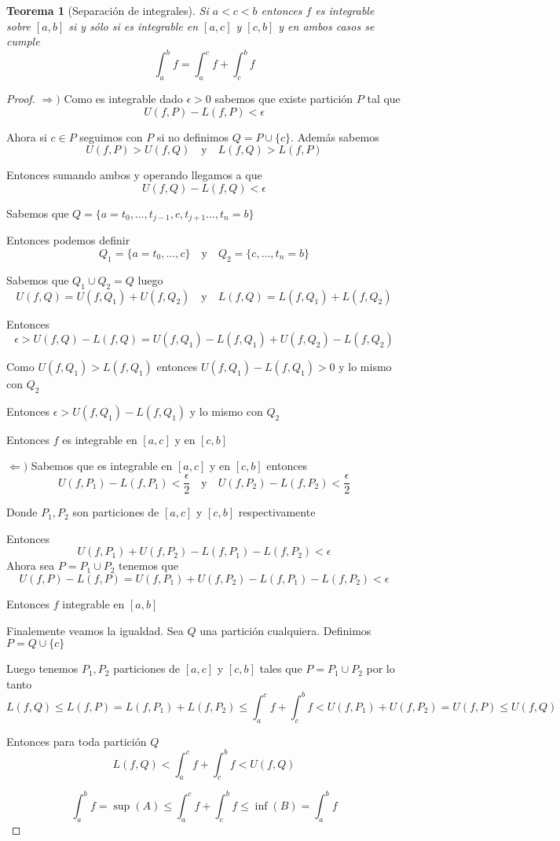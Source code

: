 \documentclass{article}
\theoremstyle{break}
\newtheorem{theorem}{Teorema}[section]
\begin{document}
\begin{theorem}[Separación de integrales]
	Si $a<c<b$ entonces $f$ es integrable sobre $[a,b]$ si y sólo si es integrable en
	$[a,c]$ y $[c,b]$ y en ambos casos se cumple 
	\[ \int_{a}^{b} f = \int_{a}^{c} f + \int_{c}^{b} f \]
\end{theorem}
\begin{proof}
	$\Rightarrow ) $ Como es integrable dado $\epsilon > 0 $ sabemos que existe partición $P$ 
	tal que \[ U(f,P)- L(f,P) < \epsilon  \]

	Ahora si $c\in P$ seguimos con $P$ si no definimos $Q=P\cup \{c\}$. Además sabemos
	\[ U(f,P) > U(f,Q) \quad \text{y} \quad L(f,Q) > L(f,P) \]

	Entonces sumando ambos y operando llegamos a que \[ U(f,Q) - L(f,Q) < \epsilon  \]

	Sabemos que $Q=\{a=t_0,\ldots,t_{j-1},c,t_{j+1}\ldots, t_n=b\}$

	Entonces podemos definir \[ Q_1=\{a=t_0,\ldots , c \} \quad \text{y}\quad Q_2=\{c,\ldots , t_n=b\} \]

	Sabemos que $Q_1\cup Q_2 = Q$ luego
	\[ U(f,Q) = U(f,Q_1) + U(f,Q_2) \quad \text{y} \quad L(f,Q)=L(f,Q_1) + L(f,Q_2)\]

	Entonces \[\epsilon > U(f,Q) - L(f,Q) = U(f,Q_1)-L(f,Q_1) + U(f,Q_2)-L(f,Q_2) \]

	Como $U(f,Q_1) > L(f,Q_1)$ entonces $U(f,Q_1) - L(f,Q_1) > 0$ y lo mismo con $Q_2$

	Entonces $\epsilon>U(f,Q_1) - L(f,Q_1)$ y lo mismo con $Q_2$

	Entonces $f$ es integrable en $[a,c]$ y en $[c,b]$

	$\Leftarrow )$ Sabemos que es integrable en $[a,c]$ y en $[c,b]$ entonces
	\[ U(f,P_1) - L(f,P_1) < \frac{\epsilon}{2} \quad \text{y} \quad U(f,P_2) - L(f,P_2) <\frac{\epsilon}{2}\]

	Donde $P_1,P_2$ son particiones de $[a,c]$ y $[c,b]$ respectivamente 

	Entonces \[ U(f,P_1) + U(f,P_2) - L(f,P_1) - L(f,P_2) < \epsilon \]
	Ahora sea $P = P_1 \cup P_2$ tenemos que 
	\[ U(f,P) - L(f,P) = U(f,P_1) + U(f,P_2) - L(f,P_1) - L(f,P_2) < \epsilon\]

	Entonces $f$ integrable en $[a,b]$

	Finalemente veamos la igualdad. Sea $Q$ una partición cualquiera. Definimos
	$P = Q\cup \{c\}$

	Luego tenemos $P_1,P_2$ particiones de $[a,c]$ y $[c,b]$ tales que $P=P_1\cup P_2$ por lo tanto
	\[ L(f,Q) \leq L(f,P) = L(f,P_1) + L(f,P_2) \leq \int_{a}^{c} f + 
	\int_{c}^{b} f < U(f,P_1) + U(f,P_2) = U(f,P) \leq U(f,Q)\]

	Entonces para toda partición $Q$
	\[ L(f,Q) < \int_{a}^{c} f + \int_{c}^{b} f < U(f,Q) \]

	\[ \int_{a}^{b} f =\sup(A) \leq \int_{a}^{c} f + \int_{c}^{b} f \leq \inf (B) = \int_{a}^{b} f \]
\end{proof}
\end{document}

